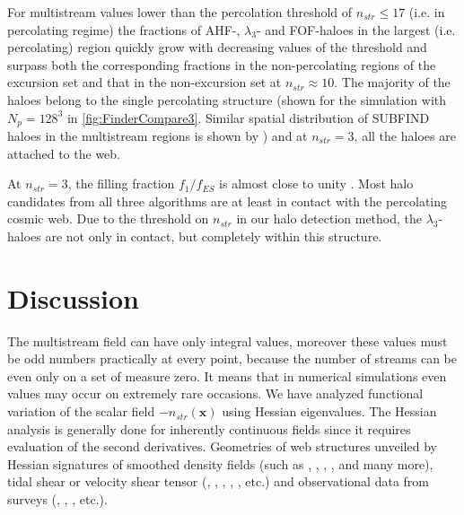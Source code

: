 For multistream values lower than the percolation threshold of $n_{str} \le 17$ (i.e. in percolating regime) the fractions of AHF-, $\lambda_3$-  and FOF-haloes in the largest (i.e. percolating) region quickly grow with decreasing values of the threshold and surpass both the corresponding fractions in the non-percolating  regions of the excursion set and that in the non-excursion set
at $n_{str} \approx 10$. The majority of the haloes belong to the single percolating structure (shown for the simulation with $N_p=128^3$ in \autoref{fig:FinderCompare3}. Similar spatial distribution of SUBFIND haloes \citealt{Springel2001a} in the multistream regions is shown by \citealt{Aragon-Calvo2016}) and at $n_{str} = 3$, all the haloes are attached to the web.  

At $n_{str} = 3$, the filling fraction $f_1 / f_{ES}$ is almost close to unity \cite{Ramachandra2017}. Most halo candidates from all three algorithms are at least in contact with the percolating cosmic web. Due to the threshold on $n_{str}$ in our halo detection method, the $\lambda_3$-haloes are not only in contact, but completely within this structure. 



\section{Discussion}
\label{sec:5discussion}



The multistream field can have only integral  values, moreover these values must be odd numbers practically at every point, because the number of streams can be even only on a set of measure zero. It means that in numerical simulations  even values may occur on extremely rare occasions. 
We have analyzed functional variation of the scalar field $-n_{str}(\mathbf{x})$ using Hessian eigenvalues. The Hessian analysis is generally done for inherently continuous fields since it requires  evaluation of the second derivatives. %
Geometries of web structures unveiled by Hessian signatures of smoothed density fields (such as \citealt{Sousbie2008a}, \citealt{Aragon-Calvo2007}, \citealt{Aragon-Calvo2010a}, \citealt{Cautun2014a}, \citealt{Bond2010a} and many more), tidal shear or velocity shear tensor (\citealt{Hahn2007}, \citealt{Forero-Romero2009a}, \citealt{Hoffman2012a}, \citealt{Hoffman2012a}, \citealt{Libeskind2013}, \citealt{Cautun2014a} etc.) and observational data from surveys (\citealt{Sousbie2008a}, \citealt{Bond2010a}, \citealt{Bond2010b}, \citealt{Pahwa2016} etc.). 


